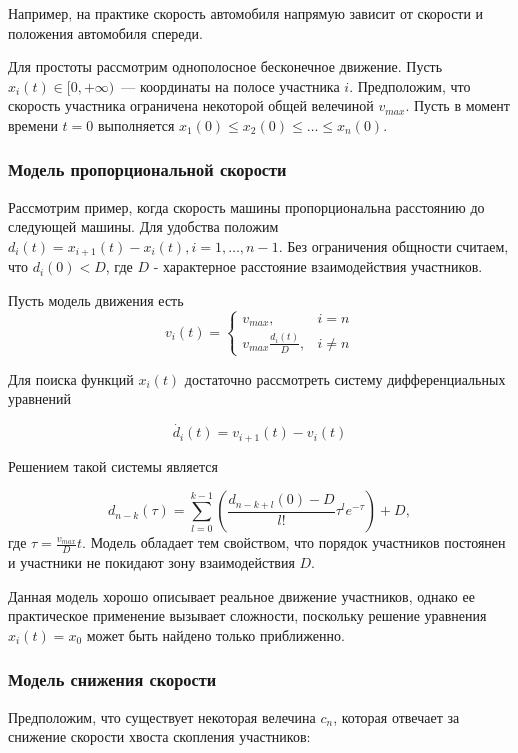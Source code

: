 \documentclass[12pt, a4paper]{article}
\begin{document}
Например, на практике скорость автомобиля напрямую зависит от скорости и положения автомобиля спереди. 

Для простоты рассмотрим однополосное бесконечное движение. Пусть ${x_i(t) \in [0, +\infty)}$~--- координаты на полосе участника $i$. Предположим, что скорость участника ограничена некоторой общей велечиной $v_{max}$. Пусть в момент времени ${t = 0}$ выполняется $x_1(0) \le x_2(0) \le \dots \le x_n(0)$.

\subsubsection*{Модель пропорциональной скорости}
Рассмотрим пример, когда скорость машины пропорциональна расстоянию до следующей машины.
Для удобства положим $d_{i} (t) = x_{i + 1} (t) - x_{i} (t), i = 1, \dots, n - 1$.
Без ограничения общности считаем, что  $d_{i} (0) < D$, где $D$ - характерное расстояние взаимодействия участников.

Пусть модель движения есть
\begin{equation}
	\label{eq:micro}
	v_i(t)=
	\begin{cases}
		v_{max}, & i = n
		\\
		v_{max} \frac{d_i(t)}{D} ,& i \ne n
	\end{cases}
\end{equation}

Для поиска функций $x_i(t)$ достаточно рассмотреть систему дифференциальных уравнений

$$ \dot{d_i} (t) = v_{i + 1} (t) - v_i (t) $$

Решением такой системы является

$$d_{n - k} (\tau) = \sum \limits_{l = 0} ^ {k - 1} \left(\frac{d_{n - k + l} (0) - D}{l!} \tau^l e ^ {-\tau}\right) + D ,$$
где ${\tau = \frac{v_{max}}{D}t}$. Модель обладает тем свойством, что порядок участников постоянен и участники не покидают зону взаимодействия $D$. 

Данная модель хорошо описывает реальное движение участников, однако ее практическое применение вызывает сложности, поскольку решение уравнения $x_i (t) = x_0$ может быть найдено только приближенно.

\subsubsection*{Модель снижения скорости}

Предположим, что существует некоторая велечина $c_n$, которая отвечает за снижение скорости хвоста скопления участников:
\end{document}
